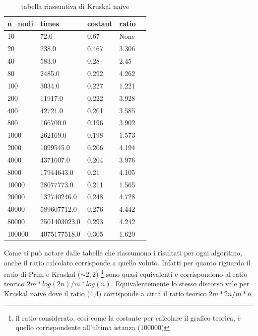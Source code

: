 \newpage
{}
\renewcommand{\arraystretch}{2}
\begin{longtable}[H]{|p{2cm}|p{2cm}|p{3cm}|p{3cm}|p{3cm}|} \hline
    \rowcolor{lightgray}
    \textbf{n\_nodi} & \textbf{times} & \textbf{costant} & \textbf{ratio} \\ \hline\hline
    \endhead
    10	&	72.0		&	0.67	&	None \\ \hline
    20	&	238.0		&	0.467	&	3.306 \\ \hline
    40	&	583.0		&	0.28 &		2.45 \\ \hline
    80	&	2485.0		&	0.292 &		4.262 \\ \hline
    100	&	3034.0		&	0.227   &	1.221 \\ \hline
    200	&	11917.0		&	0.222	&	3.928 \\ \hline
    400	&	42721.0		&	0.201	&	3.585 \\ \hline
    800	&	166700.0	&	0.196	&   3.902 \\ \hline
    1000 &	262169.0	&	0.198	&   1.573 \\ \hline
    2000 &	1099545.0	&	0.206	&   4.194 \\ \hline
    4000 &	4371607.0	&	0.204 &		3.976 \\ \hline
    8000 &	17944643.0	&	0.21 &		4.105 \\ \hline
    10000 &	28077773.0	&	0.211 &		1.565 \\ \hline
    20000 &	132740246.0	&	0.248 &		4.728 \\ \hline
    40000 &	589607712.0	&	0.276 &		4.442 \\ \hline
    80000 &	2501403023.0 &	0.293 &		4.242 \\ \hline
    100000 &	4075177518.0 &	0.305 &		1.629  \hline
    \caption{tabella riassuntiva di Kruskal naive}
\end{longtable}

Come si può notare dalle tabelle che riassumono i risultati per ogni algoritmo, anche il ratio calcolato corrisponde a quello voluto. Infatti per quanto riguarda il ratio di Prim e Kruskal ($\sim 2,2$) \footnote{il ratio considerato, così come la costante per calcolare il grafico teorica, è quello corrispondente all'ultima istanza (100000)} sono quasi equivalenti e corrispondono al ratio teorico $2m*log(2n) / m*log(n)$.
Equivalentemente lo stesso discorso vale per Kruskal naive dove il ratio (4,4) corrisponde a circa il ratio teorico $2m*2n/m*n$


